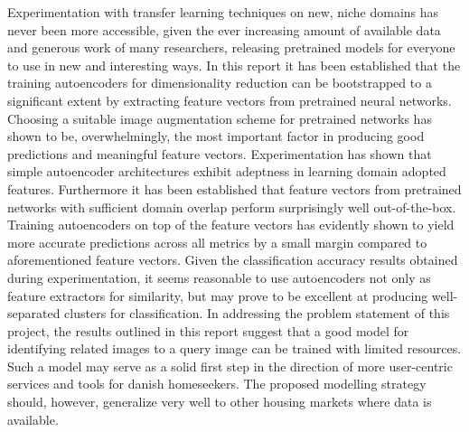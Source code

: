 Experimentation with transfer learning techniques on new, niche domains has never been more accessible, given the ever increasing amount of available data and generous work of many researchers, releasing pretrained models for everyone to use in new and interesting ways.
\newline
\newline
In this report it has been established that the training autoencoders for dimensionality reduction can be bootstrapped to a significant extent by extracting feature vectors from pretrained neural networks.
Choosing a suitable image augmentation scheme for pretrained networks has shown to be, overwhelmingly, the most important factor in producing good predictions and meaningful feature vectors.
Experimentation has shown that simple autoencoder architectures exhibit adeptness in learning domain adopted features.
Furthermore it has been established that feature vectors from pretrained networks with sufficient domain overlap perform surprisingly well out-of-the-box.
Training autoencoders on top of the feature vectors has evidently shown to yield more accurate predictions across all metrics by a small margin compared to aforementioned feature vectors.
\newline
\newline
Given the classification accuracy results obtained during experimentation, it seems reasonable to use autoencoders not only as feature extractors for similarity, but may prove to be excellent at producing well-separated clusters for classification.
\newline
\newline
In addressing the problem statement of this project, the results outlined in this report suggest that a good model for identifying related images to a query image can be trained with limited resources.
Such a model may serve as a solid first step in the direction of more user-centric services and tools for danish homeseekers.
The proposed modelling strategy should, however, generalize very well to other housing markets where data is available.



